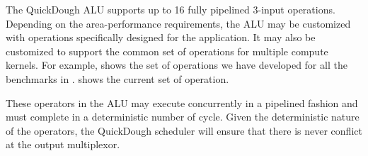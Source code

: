 The QuickDough ALU supports up to 16 fully pipelined 3-input operations.  Depending on the area-performance requirements, the ALU may be customized with operations specifically designed for the application.  It may also be customized to support the common set of operations for multiple compute kernels. For example,  shows the set of operations we have developed for all the benchmarks in .   shows the current set of operation.

These operators in the ALU may execute concurrently in a pipelined fashion and must complete in a deterministic number of cycle.  Given the deterministic nature of the operators, the QuickDough scheduler will ensure that there is never conflict at the output multiplexor.






